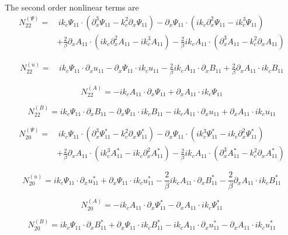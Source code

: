 \documentclass{emulateapj}
\newcommand{\beq}{\begin{equation}}
\newcommand{\eeq}{\end{equation}}
\begin{document}
The second order nonlinear terms are \\

\beq
\begin{split}
N_{22}^{(\Psi)} = & \, i k_c \Psi_{11} \cdot \left(\partial_x^3 \Psi_{11} - k_c^2 \partial_x \Psi_{11}\right) - \partial_x \Psi_{11} \cdot \left(i k_c \partial_x^2 \Psi_{11} - i k_c^3 \Psi_{11}\right) \\
& + \frac{2}{\beta}\partial_x A_{11} \cdot \left(i k_c \partial_x^2 A_{11} - i k_c^3 A_{11}\right) - \frac{2}{\beta} i k_c A_{11} \cdot \left(\partial_x^3 A_{11} - k_c^2 \partial_x A_{11}\right)
\end{split}
\eeq

\beq
\begin{split}
N_{22}^{(u)} = & \, i k_c \Psi_{11} \cdot \partial_x u_{11} - \partial_x \Psi_{11} \cdot i k_c u_{11} - \frac{2}{\beta} i k_c A_{11} \cdot \partial_x B_{11} + \frac{2}{\beta} \partial_x A_{11} \cdot i k_c B_{11}
\end{split}
\eeq

\beq
N_{22}^{(A)} = - i k_c A_{11} \cdot \partial_x \Psi_{11} + \partial_x A_{11} \cdot i k_c \Psi_{11}
\eeq

\beq
N_{22}^{(B)} = i k_c \Psi_{11} \cdot \partial_x B_{11} - \partial_x \Psi_{11} \cdot i k_c B_{11} - i k_c A_{11} \cdot \partial_x u_{11} + \partial_x A_{11} \cdot i k_c u_{11}
\eeq

\beq
\begin{split}
N_{20}^{(\Psi)} = & \, i k_c \Psi_{11} \cdot \left(\partial_x^3 \Psi_{11}^* - k_c^2 \partial_x \Psi_{11}^*\right) - \partial_x \Psi_{11} \cdot \left(i k_c^3 \Psi_{11}^* - i k_c \partial_x^2 \Psi_{11}^*\right) \\
& +\frac{2}{\beta} \partial_x A_{11} \cdot \left(i k_c^3 A_{11}^* - i k_c \partial_x^2 A_{11}^* \right) - \frac{2}{\beta} i k_c A_{11} \cdot \left(\partial_x^3 A_{11}^* - k_c^2 \partial_x A_{11}^*\right)
\end{split}
\eeq

\beq
N_{20}^{(u)} = i k_c \Psi_{11} \cdot \partial_x u_{11}^* + \partial_x \Psi_{11} \cdot i k_c u_{11}^* - \frac{2}{\beta} i k_c A_{11} \cdot \partial_x B_{11}^* - \frac{2}{\beta} \partial_x A_{11} \cdot i k_c B_{11}^*
\eeq

\beq
N_{20}^{(A)} = - i k_c A_{11} \cdot \partial_x \Psi_{11}^* - \partial_x A_{11} \cdot i k_c \Psi_{11}^*
\eeq

\beq
N_{20}^{(B)} = i k_c \Psi_{11} \cdot \partial_x B_{11}^* + \partial_x \Psi_{11} \cdot i k_c B_{11}^* - i k_c A_{11} \cdot \partial_x u_{11}^* - \partial_x A_{11} \cdot i k_c u_{11}^*
\eeq \\
\end{document}
